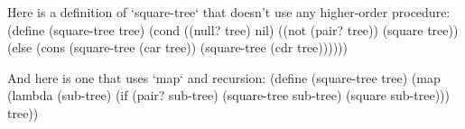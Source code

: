 Here is a definition of `square-tree` that doesn't use any higher-order procedure:
\begtt\scm
(define (square-tree tree)
  (cond ((null? tree) nil)
        ((not (pair? tree)) (square tree))
        (else (cons (square-tree (car tree))
                    (square-tree (cdr tree))))))
\endtt

And here is one that uses `map` and recursion:
\begtt\scm
(define (square-tree tree)
  (map (lambda (sub-tree)
         (if (pair? sub-tree)
             (square-tree sub-tree)
             (square sub-tree)))
       tree))
\endtt
